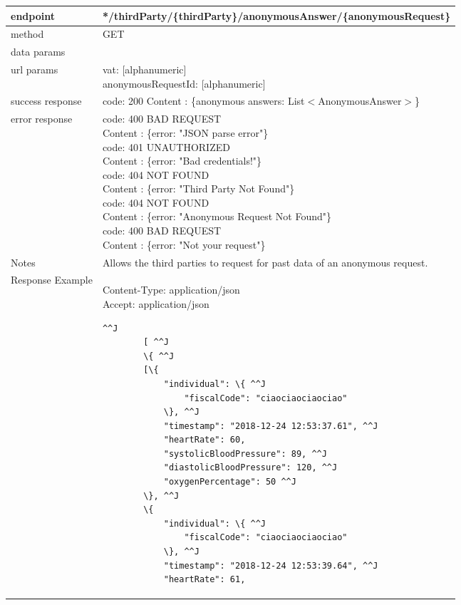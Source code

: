 	\begin{tabularx}{\linewidth}{| l| l }
		\hline
		endpoint & */thirdParty/\{thirdParty\}/anonymousAnswer/\{anonymousRequest\} \\
		\hline
		method & GET \\
		\hline
		data params & \\
		\hline
		url params &
		\parbox{0.7\textwidth}{
			\bigskip
			vat: [alphanumeric]\\
			anonymousRequestId: [alphanumeric]
			\bigskip
		} \\
		\hline
		success response &
		\parbox{0.7\textwidth}{
			\bigskip
			code: 200\\
			Content : \{anonymous answers: List$<$AnonymousAnswer$>$\}
			\bigskip
		} \\
		\hline
		error response &
		\parbox{0.7\textwidth}{
			\bigskip
			code: 400 BAD REQUEST \\
			Content : \{error: "JSON parse error"\}\\
			code: 401 UNAUTHORIZED \\
			Content : \{error: "Bad credentials!"\}\\
			code: 404 NOT FOUND \\
			Content : \{error: "Third Party Not Found"\}\\
			code: 404 NOT FOUND \\
			Content : \{error: "Anonymous Request Not Found"\}\\
			code: 400 BAD REQUEST \\
			Content : \{error: "Not your request"\}\\
			\bigskip
		} \\
		\hline
		Notes & 
		\parbox{0.7\textwidth}{
			\bigskip Allows the third parties to request for past data of an anonymous request.
		\bigskip}  \\
		\hline
		Response Example & 
		\parbox{0.8\textwidth}{
		\bigskip
		Content-Type: application/json \\
		Accept: application/json \\
		\bigskip
		\begin{lstlisting}^^J
		[ ^^J
		\{ ^^J
		[\{
			"individual": \{ ^^J
				"fiscalCode": "ciaociaociaociao"
			\}, ^^J
			"timestamp": "2018-12-24 12:53:37.61", ^^J
			"heartRate": 60,
			"systolicBloodPressure": 89, ^^J
			"diastolicBloodPressure": 120, ^^J
			"oxygenPercentage": 50 ^^J
		\}, ^^J
		\{
			"individual": \{ ^^J
				"fiscalCode": "ciaociaociaociao"
			\}, ^^J
			"timestamp": "2018-12-24 12:53:39.64", ^^J
			"heartRate": 61,

\end{lstlisting}}
\end{tabularx}
